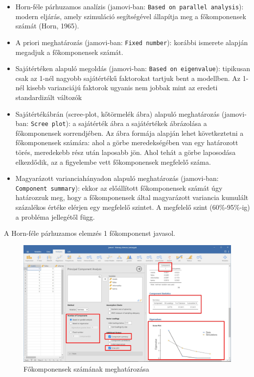 \documentclass[
  letterpaper,
]{krantz}
\providecommand{\tightlist}{%
  \setlength{\itemsep}{0pt}\setlength{\parskip}{0pt}}\usepackage{longtable,booktabs,array}
\begin{document}
\begin{itemize}
\tightlist
\item
  Horn-féle párhuzamos analízis (jamovi-ban:
  \texttt{Based\ on\ parallel\ analysis}): modern eljárás, amely
  szimuláció segítségével állapítja meg a főkomponensek számát (Horn,
  1965).
\item
  A priori meghatározás (jamovi-ban: \texttt{Fixed\ number}): korábbi
  ismerete alapján megadjuk a főkomponensek számát.
\item
  Sajátértéken alapuló megoldás (jamovi-ban:
  \texttt{Based\ on\ eigenvalue}): tipikusan csak az 1-nél nagyobb
  sajátértékű faktorokat tartjuk bent a modellben. Az 1-nél kisebb
  varianciájú faktorok ugyanis nem jobbak mint az eredeti standardizált
  változók
\item
  Sajátértékábrán (scree-plot, kőtörmelék ábra) alapuló meghatározás
  (jamovi-ban: \texttt{Scree\ plot}): a sajátérték ábra a sajátértékek
  ábrázolása a főkomponensek sorrendjében. Az ábra formája alapján lehet
  következtetni a főkomponensek számára: ahol a görbe meredekségében van
  egy határozott törés, meredekebb rész után laposabb jön. Ahol tehát a
  görbe laposodása elkezdődik, az a figyelembe vett főkomponensek
  megfelelő száma.
\item
  Magyarázott varianciahányadon alapuló meghatározás (jamovi-ban:
  \texttt{Component\ summary}): ekkor az előállított főkomponensek
  számát úgy határozzuk meg, hogy a főkomponensek által magyarázott
  variancia kumulált százalékos értéke elérjen egy megfelelő szintet. A
  megfelelő szint (60\%-95\%-ig) a probléma jellegétől függ.
\end{itemize}

A Horn-féle párhuzamos elemzés 1 főkomponenst javasol.

\begin{figure}

{\centering \includegraphics{./images/fokomponens_kep_03.jpg}

}

\caption{Főkomponensek számának meghatározása}

\end{figure}
\end{document}
